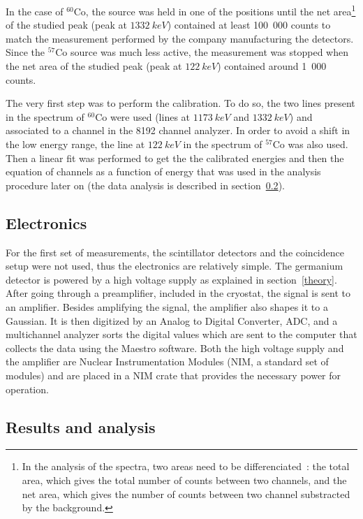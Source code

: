 \documentclass[11pt,a4paper]{article}
\begin{document}
In the case of $^{60}$Co, the source was held in one of the positions until the net area\footnote{In the analysis of the spectra, two areas need to be differenciated~: the total area, which gives the total number of counts between two channels, and the net area, which gives the number of counts between two channel substracted by the background.} of the studied peak (peak at $1332~keV$) contained at least 100~000 counts to match the measurement performed by the company manufacturing the detectors. Since the $^{57}$Co source was much less active, the measurement was stopped when the net area of the studied peak (peak at $122~keV$) contained around 1~000 counts.

The very first step was to perform the calibration. To do so, the two lines present in the spectrum of $^{60}$Co were used (lines at $1173~keV$ and $1332~keV$) and associated to a channel in the 8192 channel analyzer. In order to avoid a shift in the low energy range, the line at $122~keV$ in the spectrum of $^{57}$Co was also used. Then a linear fit was performed to get the the calibrated energies and then the equation of channels as a function of energy that was used in the analysis procedure later on (the data analysis is described in section~\ref{analysis}).

\subsection{Electronics}

For the first set of measurements, the scintillator detectors and the coincidence setup were not used, thus the electronics are relatively simple. The germanium detector is powered by a high voltage supply as explained in section~\ref{theory}. After going through a preamplifier, included in the cryostat, the signal is sent to an amplifier. Besides amplifying the signal, the amplifier also shapes it to a Gaussian. It is then digitized by an Analog to Digital Converter, ADC, and a multichannel analyzer sorts the digital values which are sent to the computer that collects the data using the Maestro software. Both the high voltage supply and the amplifier are Nuclear Instrumentation Modules (NIM, a standard set of modules) and are placed in a NIM crate that provides the necessary power for operation.

\subsection{Results and analysis} \label{analysis}
\end{document}
